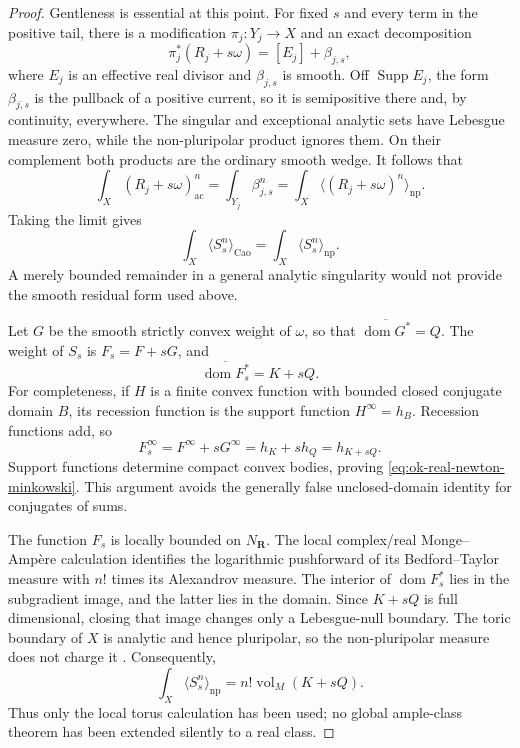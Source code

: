 \begin{proof}
Gentleness is essential at this point.  For fixed $s$ and every term in
the positive tail, there is a modification $\pi_j:Y_j\to X$ and an exact
decomposition
\[
                    \pi_j^*(R_j+s\omega)
                    =[E_j]+\beta_{j,s},
\]
where $E_j$ is an effective real divisor and $\beta_{j,s}$ is smooth.
Off $\operatorname{Supp}E_j$, the form $\beta_{j,s}$ is the pullback of
a positive current, so it is semipositive there and, by continuity,
everywhere.  The singular and exceptional analytic sets have Lebesgue
measure zero, while the non-pluripolar product ignores them.  On their
complement both products are the ordinary smooth wedge.  It follows that
\[
 \int_X(R_j+s\omega)_{\mathrm{ac}}^n
 =\int_{Y_j}\beta_{j,s}^n
 =\int_X\langle(R_j+s\omega)^n\rangle_{\mathrm{np}}.
\]
Taking the limit gives
\[
 \int_X\langle S_s^n\rangle_{\mathrm{Cao}}
 =\int_X\langle S_s^n\rangle_{\mathrm{np}}.
\tag{55.54}\label{eq:ok-cao-np-positive-perturbation}
\]
A merely bounded remainder in a general analytic singularity would not
provide the smooth residual form used above.

Let $G$ be the smooth strictly convex weight of $\omega$, so that
$\overline{\operatorname{dom}G^*}=Q$.  The weight of $S_s$ is
$F_s=F+sG$, and
\[
             \overline{\operatorname{dom}F_s^*}=K+sQ.
\tag{55.55}\label{eq:ok-real-newton-minkowski}
\]
For completeness, if $H$ is a finite convex function with bounded closed
conjugate domain $B$, its recession function is the support function
$H^\infty=h_B$.  Recession functions add, so
\[
                 F_s^\infty=F^\infty+sG^\infty
                 =h_K+s h_Q=h_{K+sQ}.
\]
Support functions determine compact convex bodies, proving
\eqref{eq:ok-real-newton-minkowski}.  This argument avoids the generally
false unclosed-domain identity for conjugates of sums.

The function $F_s$ is locally bounded on $N_{\mathbf R}$.  The local
complex/real Monge--Amp\`ere calculation
\cite[Lemmas~2.1--2.2]{CGSZ19} identifies the logarithmic pushforward of its
Bedford--Taylor measure with $n!$ times its Alexandrov measure.  The
interior of $\operatorname{dom}F_s^*$ lies in the subgradient image, and
the latter lies in the domain.  Since $K+sQ$ is full dimensional, closing
that image changes only a Lebesgue-null boundary.  The toric boundary of
$X$ is analytic and hence pluripolar, so the non-pluripolar measure does
not charge it \cite[Propositions~1.4 and~1.6]{BEGZ10}.  Consequently,
\[
 \int_X\langle S_s^n\rangle_{\mathrm{np}}
       =n!\operatorname{vol}_M(K+sQ).
\tag{55.56}\label{eq:ok-real-toric-mass}
\]
Thus only the local torus calculation has been used; no global
ample-class theorem has been extended silently to a real class.


\end{proof}
